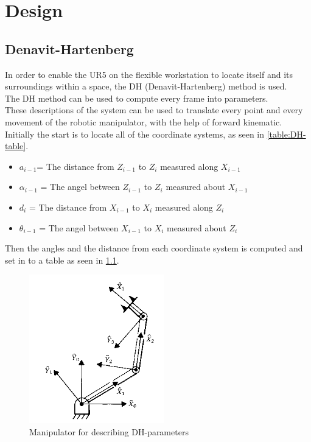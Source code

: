 \chapter{Design}

\section{Denavit-Hartenberg}

In order to enable the UR5 on the flexible workstation to locate itself and its surroundings within a space, the DH (Denavit-Hartenberg) method is used.\\ 
The DH method can be used to compute every frame into parameters.\\
These descriptions of the system can be used to translate every point and every movement of the robotic manipulator, with the help of forward kinematic.\\
Initially the start is to locate all of the coordinate systems, as seen in \ref{table:DH-table}.\\ 


\begin{itemize}
    \item ${a_{i-1}}$= The distance from ${Z_{i-1}}$ to ${Z_{i}}$ measured along ${X_{i-1}}$
    \item ${\alpha_{i-1}}$ = The angel between ${Z_{i-1}}$ to ${Z_{i}}$ measured about ${X_{i-1}}$
    \item ${d_{i}}$ = The distance from ${X_{i-1}}$ to ${X_{i}}$ measured along ${Z_{i}}$
    \item ${\theta_{i-1}}$ = The angel between ${X_{i-1}}$ to ${X_{i}}$ measured about ${Z_{i}}$
\end{itemize}


\newpage

Then the angles and the distance from each coordinate system is computed and set in to a table as seen in \ref{fig:DH-Table}.

\begin{figure}[h]
    \centering
    \includegraphics[scale=1]{Design/DHmani.PNG}
    \caption{Manipulator for describing DH-parameters \cite{DH}} 
    \label{fig:DH-Table} 
\end{figure}

